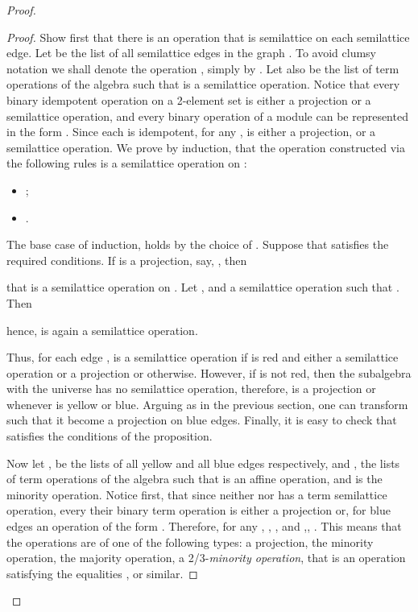 \documentclass[11pt]{article}
\begin{document}
\begin{proof}
\begin{proof}
Show first that there is an operation  that is semilattice on
each semilattice edge. Let  be the list of all semilattice edges in the graph 
. To avoid clumsy notation we shall denote the operation
,  simply by . Let also
 be the list of term operations of the algebra such that
 is a semilattice operation. Notice that every binary
idempotent operation on a 2-element set is either a projection or a
semilattice operation, and every binary operation of a module can be
represented in the form . Since each  is idempotent,
for any ,  is either a projection, or a semilattice
operation. We prove by induction, that the operation  constructed
via the following rules is a semilattice operation on :
\begin{itemize}
\item
;
\item
.
\end{itemize}

The base case of induction,  holds by the choice of
. Suppose that  satisfies the required conditions. If
 is a projection, say, ,
then 

that is a semilattice operation on . Let , and  a
semilattice operation such that . Then

hence,  is again a semilattice operation. 

Thus, for each edge ,  is a semilattice operation if 
is red and either a semilattice operation or a projection or 
otherwise. However, if  is not red, then the subalgebra with the
universe  has no semilattice operation, therefore,  is
a projection or  whenever  is yellow or blue. Arguing
as in the previous section, one can transform  such that it
become a projection on blue edges. Finally, 
it is easy to check that  satisfies the conditions of the
proposition.

Now let ,  be the lists of all yellow and all blue
    edges respectively, and ,  the lists of 
    term operations of the algebra such that  is an
    affine operation, and  is the minority
    operation. Notice first, that since neither
 nor  has a 
    term semilattice operation, every their binary term operation is 
    either a projection or, for blue edges an operation of the form . 
Therefore, for any ,
    ,
    , and 
    ,, . This means that the operations  are of one of the
    following types: a projection, the minority operation, the
    majority operation, a 2/3-{\em minority operation}, that is an
    operation satisfying the equalities ,
     or similar. 


\end{proof}
\end{proof}
\end{document}
